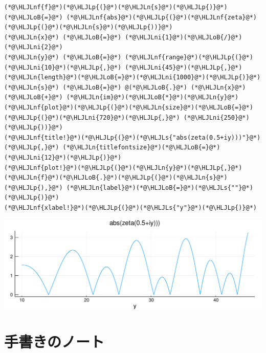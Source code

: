 \documentclass[12pt,a4paper,xelatex,ja=standard]{bxjsarticle}
\newcommand{\HLJLn}[1]{#1}
\newcommand{\HLJLnf}[1]{\textcolor[RGB]{66,102,213}{#1}}
\newcommand{\HLJLs}[1]{\textcolor[RGB]{201,61,57}{#1}}
\newcommand{\HLJLni}[1]{\textcolor[RGB]{59,151,46}{#1}}
\newcommand{\HLJLoB}[1]{\textcolor[RGB]{102,102,102}{\textbf{#1}}}
\newcommand{\HLJLp}[1]{#1}
\begin{document}
\begin{lstlisting}
(*@\HLJLnf{f}@*)(*@\HLJLp{(}@*)(*@\HLJLn{s}@*)(*@\HLJLp{)}@*) (*@\HLJLoB{=}@*) (*@\HLJLnf{abs}@*)(*@\HLJLp{(}@*)(*@\HLJLnf{zeta}@*)(*@\HLJLp{(}@*)(*@\HLJLn{s}@*)(*@\HLJLp{))}@*)
(*@\HLJLn{x}@*) (*@\HLJLoB{=}@*) (*@\HLJLni{1}@*)(*@\HLJLoB{/}@*)(*@\HLJLni{2}@*)
(*@\HLJLn{y}@*) (*@\HLJLoB{=}@*) (*@\HLJLnf{range}@*)(*@\HLJLp{(}@*)(*@\HLJLni{10}@*)(*@\HLJLp{,}@*) (*@\HLJLni{45}@*)(*@\HLJLp{,}@*) (*@\HLJLn{length}@*)(*@\HLJLoB{=}@*)(*@\HLJLni{1000}@*)(*@\HLJLp{)}@*)
(*@\HLJLn{s}@*) (*@\HLJLoB{=}@*) @(*@\HLJLoB{.}@*) (*@\HLJLn{x}@*) (*@\HLJLoB{+}@*) (*@\HLJLn{im}@*)(*@\HLJLoB{*}@*)(*@\HLJLn{y}@*)
(*@\HLJLnf{plot}@*)(*@\HLJLp{(}@*)(*@\HLJLn{size}@*)(*@\HLJLoB{=}@*)(*@\HLJLp{(}@*)(*@\HLJLni{720}@*)(*@\HLJLp{,}@*) (*@\HLJLni{250}@*)(*@\HLJLp{))}@*)
(*@\HLJLnf{title!}@*)(*@\HLJLp{(}@*)(*@\HLJLs{"abs(zeta(0.5+iy)))"}@*)(*@\HLJLp{,}@*) (*@\HLJLn{titlefontsize}@*)(*@\HLJLoB{=}@*)(*@\HLJLni{12}@*)(*@\HLJLp{)}@*)
(*@\HLJLnf{plot!}@*)(*@\HLJLp{(}@*)(*@\HLJLn{y}@*)(*@\HLJLp{,}@*) (*@\HLJLn{f}@*)(*@\HLJLoB{.}@*)(*@\HLJLp{(}@*)(*@\HLJLn{s}@*)(*@\HLJLp{),}@*) (*@\HLJLn{label}@*)(*@\HLJLoB{=}@*)(*@\HLJLs{""}@*)(*@\HLJLp{)}@*)
(*@\HLJLnf{xlabel!}@*)(*@\HLJLp{(}@*)(*@\HLJLs{"y"}@*)(*@\HLJLp{)}@*)
\end{lstlisting}


\begin{center}
\includegraphics[width=0.8\linewidth]{figures/テスト_6_1.pdf}
\end{center}

\section{手書きのノート}
\end{document}
